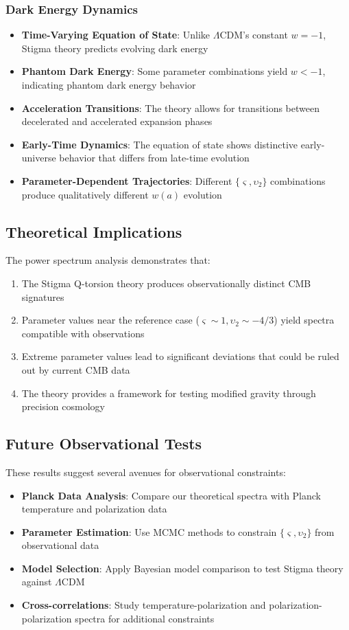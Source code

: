 \documentclass{article}
\begin{document}
\subsubsection{Dark Energy Dynamics}
\begin{itemize}
\item \textbf{Time-Varying Equation of State}: Unlike $\Lambda$CDM's constant $w = -1$, Stigma theory predicts evolving dark energy
\item \textbf{Phantom Dark Energy}: Some parameter combinations yield $w < -1$, indicating phantom dark energy behavior
\item \textbf{Acceleration Transitions}: The theory allows for transitions between decelerated and accelerated expansion phases
\item \textbf{Early-Time Dynamics}: The equation of state shows distinctive early-universe behavior that differs from late-time evolution
\item \textbf{Parameter-Dependent Trajectories}: Different $\{\varsigma, \upsilon_2\}$ combinations produce qualitatively different $w(a)$ evolution
\end{itemize}

\subsection{Theoretical Implications}

The power spectrum analysis demonstrates that:

\begin{enumerate}
\item The Stigma Q-torsion theory produces observationally distinct CMB signatures
\item Parameter values near the reference case ($\varsigma \sim 1, \upsilon_2 \sim -4/3$) yield spectra compatible with observations
\item Extreme parameter values lead to significant deviations that could be ruled out by current CMB data
\item The theory provides a framework for testing modified gravity through precision cosmology
\end{enumerate}

\subsection{Future Observational Tests}

These results suggest several avenues for observational constraints:

\begin{itemize}
\item \textbf{Planck Data Analysis}: Compare our theoretical spectra with Planck temperature and polarization data
\item \textbf{Parameter Estimation}: Use MCMC methods to constrain $\{\varsigma, \upsilon_2\}$ from observational data
\item \textbf{Model Selection}: Apply Bayesian model comparison to test Stigma theory against $\Lambda$CDM
\item \textbf{Cross-correlations}: Study temperature-polarization and polarization-polarization spectra for additional constraints
\end{itemize}
\end{document}

